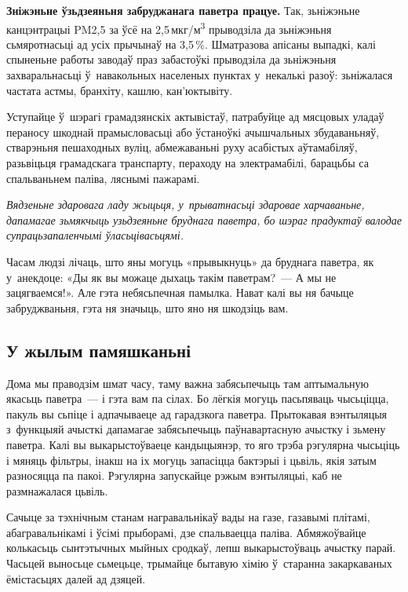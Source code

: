 \textbf{Зніжэньне ўзьдзеяньня забруджанага паветра працуе.} Так, зьніжэньне канцэнтрацыі PM2,5 за ўсё на 2,5\,мкг/м\textsuperscript{3} прыводзіла да зьніжэньня сьмяротнасьці ад усіх прычынаў на 3,5\,\%. Шматразова апісаны выпадкі, калі спыненьне работы заводаў праз забастоўкі прыводзіла да зьніжэньня захваральнасьці ў~навакольных населеных пунктах у~некалькі разоў: зьніжалася частата астмы, бранхіту, кашлю, кан'юктывіту.

Уступайце ў~шэрагі грамадзянскіх актывістаў, патрабуйце ад мясцовых уладаў пераносу шкоднай прамысловасьці або ўстаноўкі ачышчальных збудаваньняў, стварэньня пешаходных вуліц, абмежаваньні руху асабістых аўтамабіляў, разьвіцьця грамадскага транспарту, пераходу на электрамабілі, барацьбы са спальваньнем паліва, ляснымі пажарамі.

\emph{Вядзеньне здаровага ладу жыцьця, у~прыватнасьці здаровае харчаваньне, дапамагае зьмякчыць узьдзеяньне бруднага паветра, бо шэраг прадуктаў валодае супрацьзапаленчымі ўласьцівасьцямі.}

Часам людзі лічаць, што яны могуць «прывыкнуць» да бруднага паветра, як у~анекдоце: «Ды як вы можаце дыхаць такім паветрам?~--- А мы не зацягваемся!». Але гэта небясьпечная памылка. Нават калі вы ня бачыце забруджваньня, гэта ня значыць, што яно ня шкодзіць вам.

\subsection*{У жылым памяшканьні}

Дома мы праводзім шмат часу, таму важна забясьпечыць там аптымальную якасьць паветра~--- і гэта вам па сілах. Бо лёгкія могуць пасьпяваць чысьціцца, пакуль вы сьпіце і адпачываеце ад гарадзкога паветра. Прытокавая вэнтыляцыя з~функцыяй ачысткі дапамагае забясьпечыць паўнавартасную ачыстку і зьмену паветра. Калі вы выкарыстоўваеце кандыцыянэр, то яго трэба рэгулярна чысьціць і мяняць фільтры, інакш на іх могуць запасіцца бактэрыі і цьвіль, якія затым разносяцца па пакоі. Рэгулярна запускайце рэжым вэнтыляцыі, каб не размнажалася цьвіль.


Сачыце за тэхнічным станам награвальнікаў вады на газе, газавымі плітамі, абагравальнікамі і ўсімі прыборамі, дзе спальваецца паліва. Абмяжоўвайце колькасьць сынтэтычных мыйных сродкаў, лепш выкарыстоўваць ачыстку парай. Часьцей выносьце сьмецьце, трымайце бытавую хімію ў~старанна закаркаваных ёмістасьцях далей ад дзяцей.

